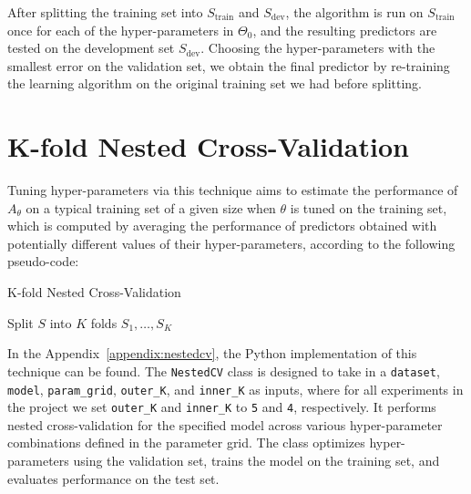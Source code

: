 After splitting the training set into $S_{\text{train}}$ and $S_{\text{dev}}$, the algorithm is run on $S_{\text{train}}$ once for each of the hyper-parameters in $\Theta_0$, and the resulting predictors are tested on the development set $S_{\text{dev}}$. Choosing the hyper-parameters with the smallest error on the validation set, we obtain the final predictor by re-training the learning algorithm on the original training set we had before splitting.

\section{K-fold Nested Cross-Validation}

Tuning hyper-parameters via this technique aims to estimate the performance of $A_\theta$ on a typical training set of a given size when $\theta$ is tuned on the training set, which is computed by averaging the performance of predictors obtained with potentially different values of their hyper-parameters, according to the following pseudo-code:

\begin{algorithm}[H]
    \SetAlgoLined
    \DontPrintSemicolon
    \caption{K-fold Nested Cross-Validation} \vspace{5pt}
    Split $S$ into $K$ folds $S_1, \dots, S_K$\\
\end{algorithm}\vspace{5pt}

In the Appendix~\ref{appendix:nestedcv}, the Python implementation of this technique can be found. The \texttt{NestedCV} class is designed to take in a \texttt{dataset}, \texttt{model}, \texttt{param\_grid}, \texttt{outer\_K}, and \texttt{inner\_K} as inputs, where for all experiments in the project we set \texttt{outer\_K} and \texttt{inner\_K} to \texttt{5} and \texttt{4}, respectively. It performs nested cross-validation for the specified model across various hyper-parameter combinations defined in the parameter grid. The class optimizes hyper-parameters using the validation set, trains the model on the training set, and evaluates performance on the test set.

